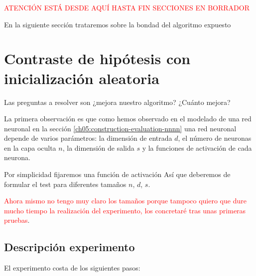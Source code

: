 
\textcolor{red}{ATENCIÓN ESTÁ DESDE AQUÍ HASTA FIN SECCIONES EN BORRADOR}

En la siguiente sección trataremos sobre la bondad del algoritmo expuesto

\section{Contraste de hipótesis con inicialización aleatoria} 
\label{ch07:experimento-1} 

Las preguntas a resolver son ¿mejora nuestro algoritmo? ¿Cuánto mejora?

La primera observación  es que como
hemos observado en el modelado de una red neuronal 
en la sección \ref{ch05:construction-evaluation-nnnn}
una red neuronal depende de varios parámetros:
la dimensión de entrada $d$, el número de neuronas en la capa oculta $n$, la dimensión de salida $s$ 
y la funciones de activación de cada neurona.  

Por simplicidad fijaremos una función de activación 
Así que deberemos de formular el test 
para diferentes tamaños $n$, $d$, $s$. 

\textcolor{red}{Ahora mismo no tengo muy claro 
los tamaños porque tampoco quiero que dure mucho tiempo la realización del experimento, los concretaré tras unas primeras pruebas}. 

\subsection{Descripción experimento}

El experimento costa de los siguientes pasos: 

